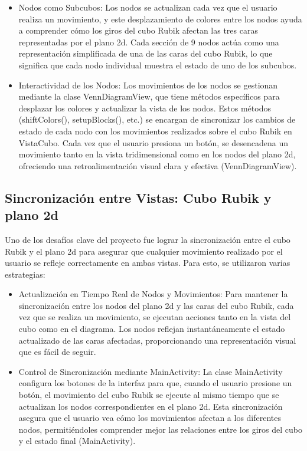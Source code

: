                                                                                                                                                                                                                                                                                                                                                                                                                                                                                                                                                                                                                                                                                                                                                                                                                                                                                                                                                                                                                                                                                                                                                                                                                                                                                                                                                                                                                                                                                                                                                                                                                                                                                                                                                                                                                                                                                                                                                                                                                                                                                                                                                                                                                                                                                                                                                                                                                                                                                                                                                                                                                                                                                                                                                                                                                                                                                                                                                                                                                                                                                                                                                                                                                                                                                                                                                                                                                                                                                                                                                                                                                                                                                                                                                                                                                                                                                                                                                                                                                                                                                                                                                                                                                                                                                                                                                                                                                                                                                                                                                                                                                                                                                                                                                                                                                                                                                                                                                                                                                                                                                                                                                                                                                                                                                                                                                                                                                                                                                                                                                                                                                                                                                                                                                                                                                                                                                                                                                                                                                                                                                                                                                                                                                                                                                                                                                                                                                                                                                                                                                                                                                                                                                                                                                                                                                                                                                                                                                                                                                                                                                                                                                                                                                                                                                                                                                                                                                                                                                                                                                                                                                                                                                                                                                                                                                                                                                                                                                                                                                                                                                                                                                                                                                                                                                                                                                                                                                                                                                                                                                                                                                                                                                                                                                                                                                                                                                                                                                                                                                                                                                                                                                                                                                                                                                                                                                                                                                                                                                                                                                                                                                                                                                                                                                                                                                                                                                                                                                                                                                                                                                                                                                                                                                                                                                                                                                                                                                                                                                                                                                                                                                                                                                                                                                                                                                                                                                                                                                                                                                                                                                                                                                                                                                                                                                                                                                                                                                                                                                                                                                                                                                                                                                                                                                                                                                                                                                                                                                                                                                                                                                                                                                                                                                                                                                                                                                                                                                                                                                                                                                                                                                                                                                                                                                                                                                                                                                                                                                                                                                                                                                                                                                                                                                                                                                                                                                                                                                                                                                                                                                                                                                                                                                                                                                                                                                                                                                                                                                                                                                                                                                                                                                                                                                                                                                                                                                                                                                                                                                                                                                                                                                                                                                                                                                                                                                                                                                                                                                                                                                                                                                                                                                                                                                                                                                                                                                                                                                                                                                                                                                                                                                                                                                                                                                                                                                                                                                                                                                                                                                                                                                                                                                                                                                                                                                                                                                                                                                                                                                                                                                                                                                                                                                                                                                                                                                                                                                                                                                                                                                                                                                                                                                                                                                                                                                                                                                                                                                                                                                                                                                                                                                                                                                                                                                                                                                                                                                                                                                                                                                                                                                                                                                                                                                                                                                                                                                                                                                                                                                                                                                                                                                                                                                                                                                                                                                                                                                                                                                                                                                                                                                                                                                                                                                                                                                                                                                                                                                                                                                                                                                                                                                                                                                                                                                                                                                                                                                                                                                                                                                                                                                                                                                                                                                                                                                                                                                                                                                                                                                                                                                                                                                                                                                                                                                                                                                                                                                                                                                                                                                                                                                                                                                                                                                                                                                                                                                                                                                                                                                                                                                                                                                                                                                                                                                                                                                                                                                                                                                                                                                                                                                                                                                                                                                                                                                                                                                                                                                                                                                                                                                                                                                                                                                                                                                                                                                                                                                                                                                                                                                                                                                                                                                                                                                                                                                                                                                                                                                                                                                                                                                                                                                                                                                                                                                                                                                                                                                                                                                                                                                                                                                                                                                                                                                                                                                                                                                                                                                                                                                                                                                                                                                                                                                                                                                                                                                                                                                                                                                                                                                                                                                                                                                                                                                                                                                                                                                                                                                                                                                                                                                                                                                                                                                                                                                                                                                                                                                                                                                                                                                                                                                                                                                                                                                                                                                                                                                                                                                                                                                                                                                                                                                                                                                                                                                                                                                                                                                                                                                                                                                                                                                                                                                                                                                                                                                                                                                                                                                                                                                                                                                                                                                                                                                                                                                                                                                                                                                                                                                                                                                                                                                                                                                                                                                                                                                                                                                                                                                                                                                                                                                                                                                                                                                                                                                                                                                                                                                                                                                                                                                                                                                                                                                                                                                                                                                                                                                                                                                                                                                                                                                                                                                                                                                                                                                                                                                                                                                                                                                                                                                                                                                                                                                                                                                                                                                                                                                                                                                                                                                                                                                                                                                                                                                                                                                                                                                                                                                                                                                                                                                                                                                                                                                                                                                                                                                                                                                                                                                                                                                                                                                                                                                                                                                                                                                                                                                                                                                                                                                                                                                                                                                                                                                                                                                                                                                                                                                                                                                                                                                                                                                                                                                                                                                                                                                                                                                                                                                                                                                                                                                                                                                                                                                                                                                                                                                                                                                                                                                                                                                                                                                                                                                                                                                                                                                                                                                                                                                                                                                                                                                                                                                                                                                                                                                                                                                                                                                                                                                                                                                                                                                                                                                                                                                                                                                                                                                                                                                                                                                                                                                                                                                                                                                                                                                                                                                                                                                                                                                                                                                                                                                                                                                                                                                                                                                                                                                                                                                                                                                                                                                                                                                                                                                                                                                                                                                                                                                                                                                                                                                                                                                                                                                                                                                                                                                                                                                                                                                                                                                                                                                                                                                                                                                                                                                                                                                                                                                                                                                                                                                                                                                                                                                                                                                                                                                                                                                                                                                                                                                                                                                                                                                                                                                                                                                                                                                                                                                                                                                                                                                                                                                                                                                                                                                                                                                                                                                                                                                                                                                                                                                                                                                                                                                                                                                                                                                                                                                                                                                                                                                                                                                                                                                                                                                                                                                                                                                                                                                                                                                                                                                                                                                                                                                                                                                                                                                                                                                                                                                                                                                                                                                                                                                                                                                                                                                                                                                                                                                                                                                                                                                                                                                                                                                                                                                                                                                                                                                                                                                                                                                                                                                                                                                                                                                                                                                                                                                                                                                                                                                                                                                                                                                                                                                                                                                                                                                                                                                                                                                                                                                                                                                                                                                                                                                                                                                                                                                                                                                                                                                                                                                                                                                                                                                                                                                                                                                                                                                                                                                                                                                                                                                                                                                                                                                                                                                                                                                                                                                                                                                                                                                                                                                                                                                                                                                                                                                                                                                                                                                                                                                                                                                                                                                                                                                                                                                                                                                                                                                                                                                                                                                                                                                                                                                                                                                                                                                                                                                                                                                                                                                                                                                                                                                                                                                                                                                                                                                                                                                                                                                                                                                                                                                                                                                                                                                                                                                                                                                                                                                                                                                                                                                                                                                                                                                                                                                                                                                                                                                                                                                                                \documentclass[conference]{IEEEtran}
\begin{document}
\begin{itemize}
    \item Nodos como Subcubos: Los nodos se actualizan cada vez que el usuario realiza un movimiento, y este desplazamiento de colores entre los nodos ayuda a comprender cómo los giros del cubo Rubik afectan las tres caras representadas por el plano 2d. Cada sección de 9 nodos actúa como una representación simplificada de una de las caras del cubo Rubik, lo que significa que cada nodo individual muestra el estado de uno de los subcubos.
    \item Interactividad de los Nodos: Los movimientos de los nodos se gestionan mediante la clase VennDiagramView, que tiene métodos específicos para desplazar los colores y actualizar la vista de los nodos. Estos métodos (shiftColors(), setupBlocks(), etc.) se encargan de sincronizar los cambios de estado de cada nodo con los movimientos realizados sobre el cubo Rubik en VistaCubo. Cada vez que el usuario presiona un botón, se desencadena un movimiento tanto en la vista tridimensional como en los nodos del plano 2d, ofreciendo una retroalimentación visual clara y efectiva (VennDiagramView).
  
\end{itemize}

\subsection{Sincronización entre Vistas: Cubo Rubik y plano 2d} 

Uno de los desafíos clave del proyecto fue lograr la sincronización entre el cubo Rubik y el plano 2d para asegurar que cualquier movimiento realizado por el usuario se refleje correctamente en ambas vistas. Para esto, se utilizaron varias estrategias:

\begin{itemize}
    \item Actualización en Tiempo Real de Nodos y Movimientos: Para mantener la sincronización entre los nodos del plano 2d y las caras del cubo Rubik, cada vez que se realiza un movimiento, se ejecutan acciones tanto en la vista del cubo como en el diagrama. Los nodos reflejan instantáneamente el estado actualizado de las caras afectadas, proporcionando una representación visual que es fácil de seguir.
    \item Control de Sincronización mediante MainActivity: La clase MainActivity configura los botones de la interfaz para que, cuando el usuario presione un botón, el movimiento del cubo Rubik se ejecute al mismo tiempo que se actualizan los nodos correspondientes en el plano 2d. Esta sincronización asegura que el usuario vea cómo los movimientos afectan a los diferentes nodos, permitiéndoles comprender mejor las relaciones entre los giros del cubo y el estado final (MainActivity).
\end{itemize}
\end{document}
